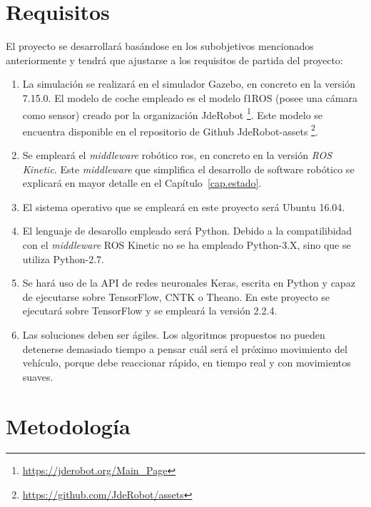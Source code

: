 \section{Requisitos}

El proyecto se desarrollará basándose en los subobjetivos mencionados anteriormente y tendrá que ajustarse a los requisitos de partida del proyecto: 

\begin{enumerate}
    \item La simulación se realizará en el simulador Gazebo, en concreto en la versión 7.15.0. El modelo de coche empleado es el modelo f1ROS (posee una cámara como sensor) creado por la organización JdeRobot \footnote{\url{https://jderobot.org/Main_Page}}. Este modelo se encuentra disponible en el repositorio de Github JdeRobot-assets \footnote{\url{https://github.com/JdeRobot/assets}}.

    \item Se empleará el \textit{middleware} robótico \acrshort{ros}, en concreto en la versión \textit{ROS Kinetic}. Este \textit{middleware} que simplifica el desarrollo de software robótico se explicará en mayor detalle en el Capítulo~\ref{cap.estado}. 

    \item El sistema operativo que se empleará en este proyecto será Ubuntu 16.04.
    
    \item El lenguaje de desarollo empleado será Python. Debido a la compatilibidad con el \textit{middleware} ROS Kinetic no se ha empleado Python-3.X, sino que se utiliza Python-2.7.
    
    \item Se hará uso de la API de redes neuronales Keras, escrita en Python y capaz de ejecutarse sobre TensorFlow, CNTK o Theano. En este proyecto se ejecutará sobre TensorFlow y se empleará la versión 2.2.4.
    
    \item Las soluciones deben ser ágiles. Los algoritmos propuestos no pueden detenerse demasiado tiempo a pensar cuál será el próximo movimiento del vehículo, porque debe reaccionar rápido, en tiempo real y con movimientos suaves.
    
\end{enumerate}


\section{Metodología}

